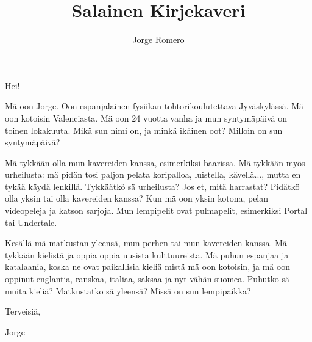 

\title{Salainen Kirjekaveri}
\author{Jorge Romero}


\thispagestyle{empty}

Hei!

Mä oon Jorge. Oon espanjalainen fysiikan tohtorikoulutettava Jyväskylässä. Mä oon kotoisin Valenciasta. Mä oon 24 vuotta vanha ja mun syntymäpäivä on toinen lokakuuta. Mikä sun nimi on, ja minkä ikäinen oot? Milloin on sun syntymäpäivä? 

Mä tykkään olla mun kavereiden kanssa, esimerkiksi baarissa. Mä tykkään myös urheilusta: mä pidän tosi paljon pelata koripalloa, luistella, kävellä..., mutta en tykää käydä lenkillä. Tykkäätkö sä urheilusta? Jos et, mitä harrastat? Pidätkö olla yksin tai olla kavereiden kanssa? Kun mä oon yksin kotona, pelan videopeleja ja katson sarjoja. Mun lempipelit ovat pulmapelit, esimerkiksi Portal tai Undertale.

Kesällä mä matkustan yleensä, mun perhen tai mun kavereiden kanssa. Mä tykkään kielistä ja oppia oppia uusista kulttuureista. Mä puhun espanjaa ja katalaania, koska ne ovat paikallisia kieliä mistä mä oon kotoisin, ja mä oon oppinut englantia, ranskaa, italiaa, saksaa ja nyt vähän suomea. Puhutko sä muita kieliä? Matkustatko sä yleensä? Missä on sun lempipaikka? 

Terveisiä,

Jorge




